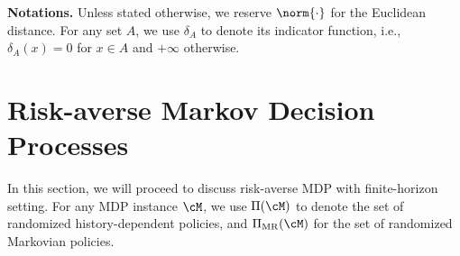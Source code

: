 \documentclass[9pt]{article}
\numberwithin{equation}{section}
\begin{document}
 \vspace{0.05in}

{\bf Notations.}
Unless stated otherwise, we reserve $\norm{\cdot}$ for the Euclidean distance. 
For any set $A$, we use $\delta_{A}$ to denote its indicator function, i.e., $\delta_{A}(x) = 0$ for $x \in A$ and $+\infty$ otherwise. 










\section{Risk-averse Markov Decision Processes}\label{sec_risk_mdp}
In this section, we will proceed to discuss risk-averse MDP with finite-horizon setting.
For any MDP instance $\cM$, we use $\Pi(\cM)$ to denote the set of randomized history-dependent policies,
and $\Pi_{\mathrm{MR}}(\cM)$ for the set of randomized Markovian policies.
\end{document}
